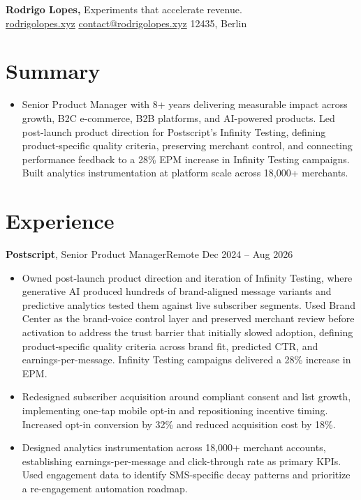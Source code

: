 \documentclass[11pt,a4paper]{article}
\begin{document}
\begin{center}
  {\Huge\bfseries Rodrigo Lopes,} {\small Experiments that accelerate revenue.}\\[6pt]
  \href{https://rodrigolopes.xyz/?utm_source=resume&utm_medium=pdf}{rodrigolopes.xyz} \textbar{}
  \href{mailto:contact@rodrigolopes.xyz}{contact@rodrigolopes.xyz} \textbar{}
  12435, Berlin
\end{center}

\vspace{8pt}

\section*{Summary}
\begin{itemize}[leftmargin=*, label=$\bullet$, itemsep=0pt, parsep=4pt]
\item Senior Product Manager with 8+ years delivering measurable impact across growth, B2C e-commerce, B2B platforms, and AI-powered products. Led post-launch product direction for Postscript's Infinity Testing, defining product-specific quality criteria, preserving merchant control, and connecting performance feedback to a 28\% EPM increase in Infinity Testing campaigns. Built analytics instrumentation at platform scale across 18,000+ merchants.
\end{itemize}

\vspace{2pt}

\section*{Experience}

\noindent\textbf{Postscript}, Senior Product Manager\hfill Remote \textbar{} Dec 2024 -- Aug 2026
\begin{itemize}[leftmargin=*, label=$\bullet$, itemsep=4pt, parsep=0pt]
\item Owned post-launch product direction and iteration of Infinity Testing, where generative AI produced hundreds of brand-aligned message variants and predictive analytics tested them against live subscriber segments. Used Brand Center as the brand-voice control layer and preserved merchant review before activation to address the trust barrier that initially slowed adoption, defining product-specific quality criteria across brand fit, predicted CTR, and earnings-per-message. Infinity Testing campaigns delivered a 28\% increase in EPM.

\item Redesigned subscriber acquisition around compliant consent and list growth, implementing one-tap mobile opt-in and repositioning incentive timing. Increased opt-in conversion by 32\% and reduced acquisition cost by 18\%.

\item Designed analytics instrumentation across 18,000+ merchant accounts, establishing earnings-per-message and click-through rate as primary KPIs. Used engagement data to identify SMS-specific decay patterns and prioritize a re-engagement automation roadmap.
\end{itemize}
\end{document}
